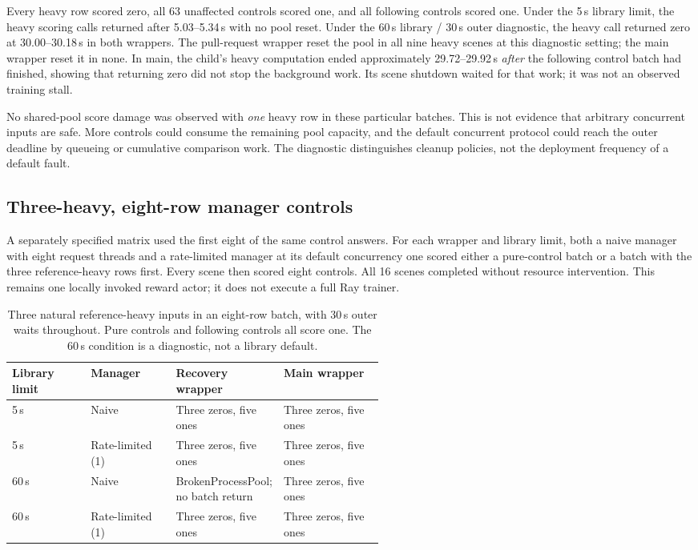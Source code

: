 \documentclass[10pt,a4paper]{article}
\begin{document}
Every heavy row scored zero, all 63 unaffected controls scored one, and all
following controls scored one. Under the 5\,s library limit, the heavy
scoring calls returned after 5.03--5.34\,s with no pool reset. Under the
60\,s library / 30\,s outer diagnostic, the heavy call returned zero at
30.00--30.18\,s in both wrappers. The pull-request wrapper reset the pool
in all nine heavy scenes at this diagnostic setting; the main wrapper reset
it in none. In main, the child's heavy computation ended approximately
29.72--29.92\,s \emph{after} the following control batch had finished,
showing that returning zero did not stop the background work. Its scene
shutdown waited for that work; it was not an observed training stall.

No shared-pool score damage was observed with \emph{one} heavy row in
these particular batches. This is not evidence that arbitrary concurrent
inputs are safe. More controls could consume the remaining pool capacity,
and the default concurrent protocol could reach the outer deadline by
queueing or cumulative comparison work. The diagnostic distinguishes
cleanup policies, not the deployment frequency of a default fault.
\subsection{Three-heavy, eight-row manager controls}

A separately specified matrix used the first eight of the same control
answers. For each wrapper and library limit, both a naive manager with
eight request threads and a rate-limited manager at its default concurrency
one scored either a pure-control batch or a batch with the three
reference-heavy rows first. Every scene then scored eight controls. All
16 scenes completed without resource intervention. This remains one
locally invoked reward actor; it does not execute a full Ray trainer.

\begin{table}[h]
\centering\small
\begin{tabular}{@{}llp{0.27\linewidth}p{0.27\linewidth}@{}}
\toprule
Library limit & Manager & Recovery wrapper & Main wrapper \\
\midrule
5\,s & Naive & Three zeros, five ones & Three zeros, five ones \\
5\,s & Rate-limited (1) & Three zeros, five ones & Three zeros, five ones \\
60\,s & Naive & BrokenProcessPool; no batch return & Three zeros, five ones \\
60\,s & Rate-limited (1) & Three zeros, five ones & Three zeros, five ones \\
\bottomrule
\end{tabular}
\caption{Three natural reference-heavy inputs in an eight-row batch,
with 30\,s outer waits throughout. Pure controls and following controls
all score one. The 60\,s condition is a diagnostic, not a library default.}
\label{tab:threeheavy}
\end{table}
\end{document}
